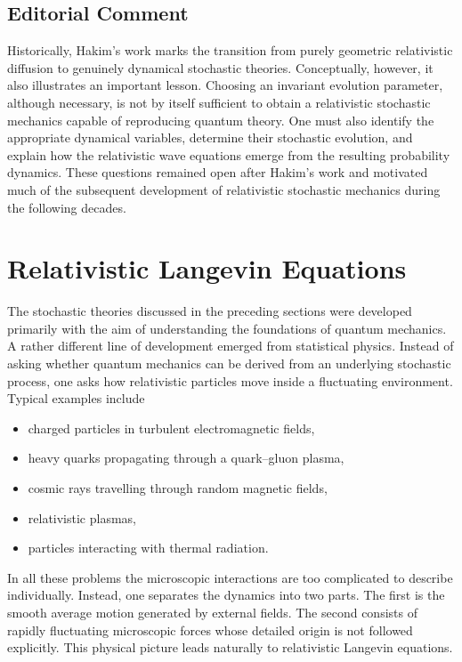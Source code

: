 \subsection*{Editorial Comment}
Historically, Hakim's work marks the transition from purely geometric
relativistic diffusion to genuinely dynamical stochastic theories.
Conceptually, however, it also illustrates an important lesson.
Choosing an invariant evolution parameter, although necessary, is not by
itself sufficient to obtain a relativistic stochastic mechanics capable
of reproducing quantum theory.
One must also identify the appropriate dynamical variables, determine
their stochastic evolution, and explain how the relativistic wave
equations emerge from the resulting probability dynamics.
These questions remained open after Hakim's work and motivated much of
the subsequent development of relativistic stochastic mechanics during
the following decades.
\section{Relativistic Langevin Equations}
\label{sec:RelLangevin}
The stochastic theories discussed in the preceding sections were
developed primarily with the aim of understanding the foundations of
quantum mechanics. A rather different line of development emerged from
statistical physics.
Instead of asking whether quantum mechanics can be derived from an
underlying stochastic process, one asks how relativistic particles move
inside a fluctuating environment.
Typical examples include
\begin{itemize}
\item charged particles in turbulent electromagnetic fields,
\item heavy quarks propagating through a quark--gluon plasma,
\item cosmic rays travelling through random magnetic fields,
\item relativistic plasmas,
\item particles interacting with thermal radiation.
\end{itemize}
In all these problems the microscopic interactions are too complicated
to describe individually.
Instead, one separates the dynamics into two parts.
The first is the smooth average motion generated by external fields.
The second consists of rapidly fluctuating microscopic forces whose
detailed origin is not followed explicitly.
This physical picture leads naturally to relativistic Langevin
equations.
